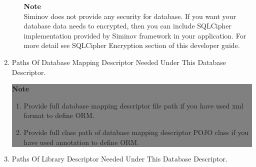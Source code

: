 \begin{enumerate}
\begin{enumerate}
\begin{center}
{{						\hfill \textbf{Note} \\

						\hfill 	Siminov does not provide any security for database. If you want your database data needs to encrypted, then you can include SQLCipher implementation provided by Siminov framework in your application. For more detail see SQLCipher Encryption section of this developer guide.

						\vspace*{0.0cm} %
					}
			}

			\end{center}

		\end{enumerate}


	\item \small Paths Of Database Mapping Descriptor Needed Under This Database Descriptor. 

			\begin{center}
				\colorbox{grey}{
					\parbox[t]{.8\linewidth}{
						\fontsize{11pt}{11pt}\selectfont %
						\vspace*{0.1cm} %
		
						\hfill \textbf{Note} \\

						\hfill 

						\begin{enumerate}

							\item \small Provide full database mapping descriptor file path if you have used xml format to define ORM.

							\item \small Provide full class path of database mapping descriptor POJO class if you have used annotation to define ORM.
	
						\end{enumerate}

						\vspace*{0.0cm} %
					}
			}

			\end{center}

	\item \small Paths Of Library Descriptor Needed Under This Database Descriptor.


\end{enumerate}
